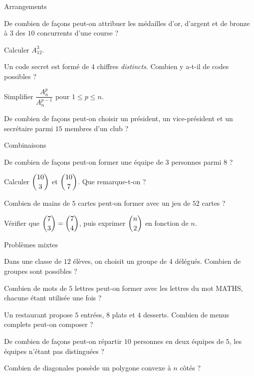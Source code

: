 \begin{exercice}[1]{Arrangements}
\begin{questions}
  \item De combien de façons peut-on attribuer les médailles d'or, d'argent et de bronze à $3$ des $10$ concurrents d'une course ?
  \item Calculer $A_{12}^{3}$.
  \item Un code secret est formé de $4$ chiffres \emph{distincts}. Combien y a-t-il de codes possibles ?
  \item Simplifier $\dfrac{A_n^{p}}{A_n^{p-1}}$ pour $1\leq p\leq n$.
  \item De combien de façons peut-on choisir un président, un vice-président et un secrétaire parmi $15$ membres d'un club ?
\end{questions}
\end{exercice}

\begin{exercice}[1]{Combinaisons}
\begin{questions}
  \item De combien de façons peut-on former une équipe de $3$ personnes parmi $8$ ?
  \item Calculer $\dbinom{10}{3}$ et $\dbinom{10}{7}$. Que remarque-t-on ?
  \item Combien de mains de $5$ cartes peut-on former avec un jeu de $52$ cartes ?
  \item Vérifier que $\dbinom73=\dbinom74$, puis exprimer $\dbinom n2$ en fonction de $n$.
\end{questions}
\end{exercice}


\begin{exercice}[2]{Problèmes mixtes}
\begin{questions}
  \item Dans une classe de $12$ élèves, on choisit un groupe de $4$ délégués. Combien de groupes sont possibles ?
  \item Combien de mots de $5$ lettres peut-on former avec les lettres du mot MATHS, chacune étant utilisée une fois ?
  \item Un restaurant propose $5$ entrées, $8$ plats et $4$ desserts. Combien de menus complets peut-on composer ?
  \item De combien de façons peut-on répartir $10$ personnes en deux équipes de $5$, les équipes n'étant pas distinguées ?
  \item Combien de diagonales possède un polygone convexe à $n$ côtés ?
\end{questions}
\end{exercice}

